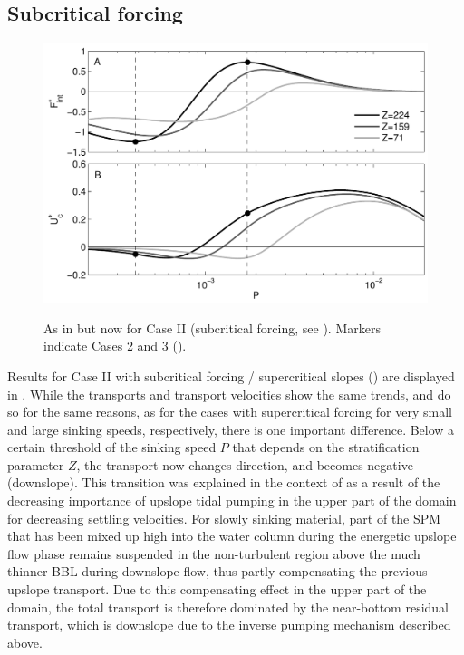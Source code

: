 \subsection{Subcritical forcing}
\begin{figure}[h]
  \noindent\includegraphics[width=29pc,angle=0]{bilder/supercrit.pdf}\\	
  \caption{As in  but now for Case II (subcritical
    forcing, see ).  Markers indicate Cases 2 and 3
    ().}\label{supercrit}
\end{figure}
Results for Case II with subcritical forcing / supercritical slopes
() are displayed in . While the
transports and transport velocities show the same trends, and do so
for the same reasons, as for the cases with supercritical forcing for
very small and large sinking speeds, respectively, there is one
important difference. Below a certain threshold of the sinking speed
$P$ that depends on the stratification parameter $Z$, the transport
now changes direction, and becomes negative (downslope). This
transition was explained in the context of  as a
result of the decreasing importance of upslope tidal pumping in the
upper part of the domain for decreasing settling velocities. For
slowly sinking material, part of the SPM that has been mixed up high
into the water column during the energetic upslope flow phase remains
suspended in the non-turbulent region above the much thinner BBL
during downslope flow, thus partly compensating the previous upslope
transport. Due to this compensating effect in the upper part of the
domain, the total transport is therefore dominated by the near-bottom
residual transport, which is downslope due to the inverse pumping
mechanism described above.

